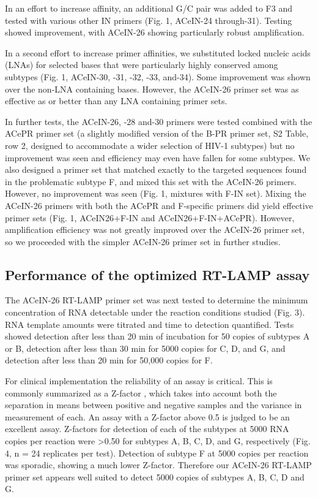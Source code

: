 \documentclass[../sherrill-Mix_thesis.tex]{subfiles}
\begin{document}
		In an effort to increase affinity, an additional G/C pair was added to F3 and tested with various other IN primers (Fig. 1, ACeIN-24 through-31). Testing showed improvement, with ACeIN-26 showing particularly robust amplification.

		In a second effort to increase primer affinities, we substituted locked nucleic acids (LNAs) for selected bases that were particularly highly conserved among subtypes (Fig. 1, ACeIN-30, -31, -32, -33, and-34). Some improvement was shown over the non-LNA containing bases. However, the ACeIN-26 primer set was as effective as or better than any LNA containing primer sets.

		In further tests, the ACeIN-26, -28 and-30 primers were tested combined with the ACePR primer set (a slightly modified version of the B-PR primer set, S2 Table, row 2, designed to accommodate a wider selection of HIV-1 subtypes) but no improvement was seen and efficiency may even have fallen for some subtypes. We also designed a primer set that matched exactly to the targeted sequences found in the problematic subtype F, and mixed this set with the ACeIN-26 primers. However, no improvement was seen (Fig. 1, mixtures with F-IN set). Mixing the ACeIN-26 primers with both the ACePR and F-specific primers did yield effective primer sets (Fig. 1, ACeIN26+F-IN and ACeIN26+F-IN+ACePR). However, amplification efficiency was not greatly improved over the ACeIN-26 primer set, so we proceeded with the simpler ACeIN-26 primer set in further studies.

		\subsection{Performance of the optimized RT-LAMP assay}
		The ACeIN-26 RT-LAMP primer set was next tested to determine the minimum concentration of RNA detectable under the reaction conditions studied (Fig. 3). RNA template amounts were titrated and time to detection quantified. Tests showed detection after less than 20 min of incubation for 50 copies of subtypes A or B, detection after less than 30 min for 5000 copies for C, D, and G, and detection after less than 20 min for 50,000 copies for F.

		For clinical implementation the reliability of an assay is critical. This is commonly summarized as a Z-factor \citep{Zhang1999}, which takes into account both the separation in means between positive and negative samples and the variance in measurement of each. An assay with a Z-factor above 0.5 is judged to be an excellent assay. Z-factors for detection of each of the subtypes at 5000 RNA copies per reaction were >0.50 for subtypes A, B, C, D, and G, respectively (Fig. 4, n = 24 replicates per test). Detection of subtype F at 5000 copies per reaction was sporadic, showing a much lower Z-factor. Therefore our ACeIN-26 RT-LAMP primer set appears well suited to detect 5000 copies of subtypes A, B, C, D and G.
\end{document}
